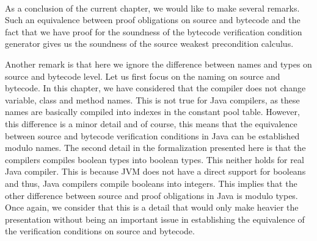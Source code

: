 \Qed \\

As a conclusion of the current chapter, we would like to make several remarks. 
Such an equivalence between proof obligations on source and bytecode and the fact that
we have proof for the soundness of the bytecode verification condition generator
 gives us the soundness of the source  weakest precondition calculus.  

Another remark is that here we ignore the difference between names and types on  source and bytecode level. 
Let us first focus on the naming on source and bytecode. 
In this chapter, we have considered that the compiler  does not change  variable, class and method  names.
 This is not true for Java compilers, as these names are basically compiled into 
indexes in the constant pool table. However, this difference is a minor detail and of course, this means that 
the equivalence between source and bytecode verification conditions in Java can be established modulo names.
The second detail in the formalization presented here is that the compilers compiles boolean types into boolean types.
This neither holds for real Java compiler. This is because JVM does not have a direct support  for booleans and thus,
Java compilers compile booleans into integers. This implies that the other difference between source and proof
obligations in Java is modulo types. Once again, we consider that this is a detail that would only make heavier
the presentation without being an important issue in establishing the equivalence of the verification conditions on source and bytecode. 
